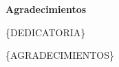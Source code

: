 {\huge\bfseries \space Agradecimientos}

    \vspace*{20 mm}
    \{DEDICATORIA\}%
    
    \bigskip
    
    \{AGRADECIMIENTOS\}%
    
\vspace*{\fill}

\newpage  
